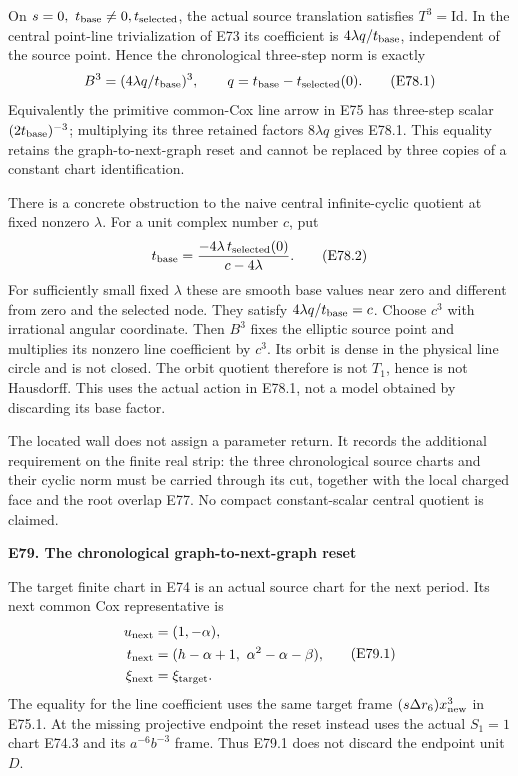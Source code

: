 On \(s=0,\ t_{\rm base}\ne0,t_{\rm selected}\), the actual
source translation satisfies \(T^3=\mathrm{Id}\). In the
central point-line trivialization of E73 its coefficient is
\(4\lambda q/t_{\rm base}\), independent of the source
point. Hence the chronological three-step norm is exactly
\[
             B^3=(4\lambda q/t_{\rm base})^3,\qquad
             q=t_{\rm base}-t_{\rm selected}(0).
 \tag{E78.1}
\]
Equivalently the primitive common-Cox line arrow in E75
has three-step scalar \((2t_{\rm base})^{-3}\); multiplying
its three retained factors \(8\lambda q\) gives E78.1.
This equality retains the graph-to-next-graph reset and
cannot be replaced by three copies of a constant chart
identification.

There is a concrete obstruction to the naive central
infinite-cyclic quotient at fixed nonzero \(\lambda\).
For a unit complex number \(c\), put
\[
        t_{\rm base}
          =\frac{-4\lambda\,t_{\rm selected}(0)}
                         {c-4\lambda}.
 \tag{E78.2}
\]
For sufficiently small fixed \(\lambda\) these are smooth
base values near zero and different from zero and the
selected node. They satisfy
\(4\lambda q/t_{\rm base}=c\).
Choose \(c^3\) with irrational angular coordinate.
Then \(B^3\) fixes the elliptic source point and multiplies
its nonzero line coefficient by \(c^3\). Its orbit is dense
in the physical line circle and is not closed. The orbit
quotient therefore is not \(T_1\), hence is not Hausdorff.
This uses the actual action in E78.1, not a model obtained
by discarding its base factor.

The located wall does not assign a parameter return.
It records the additional requirement on the finite real
strip: the three chronological source charts and their
cyclic norm must be carried through its cut, together with
the local charged face and the root overlap E77.
No compact constant-scalar central quotient is claimed.

\par

\medskip\noindent\textbf{E79. The chronological graph-to-next-graph reset}

\par\nobreak

The target finite chart in E74 is an actual source chart
for the next period. Its next common Cox representative is
\[
\begin{aligned}
 u_{\rm next}&=(1,-\alpha),\\
 t_{\rm next}&=(h-\alpha+1,\ \alpha^2-\alpha-\beta),\\
 \xi_{\rm next}&=\xi_{\rm target}.
\end{aligned}                                                     \tag{E79.1}
\]
The equality for the line coefficient uses the same target
frame \((s\Delta r_6)x_{\rm new}^3\) in E75.1.
At the missing projective endpoint the reset instead uses
the actual \(S_1=1\) chart E74.3 and its \(a^{-6}b^{-3}\)
frame. Thus E79.1 does not discard the endpoint unit \(D\).

